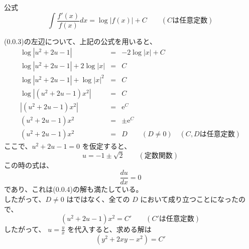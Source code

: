 \documentclass[dvipdfmx,uplatex]{jsarticle}
\begin{document}
\begin{spacing}{1.6}
\begin{qparts}
\begin{itembox}{公式}
       \begin{equation}
         \int \frac{f{\prime}(x)}{f(x)} dx = \log |f(x)| + C \qquad (Cは任意定数) \nonumber
       \end{equation}
    \end{itembox}
    (0.0.3)の左辺について、上記の公式を用いると、
    \begin{eqnarray}
      \log |u ^ 2 + 2u - 1| & = & -2 \log |x| + C \nonumber \\
      \log |u ^ 2 + 2u - 1| + 2 \log |x| & = & C \nonumber \\
      \log |u ^ 2 + 2u - 1| + \log |x| ^ 2 & = & C \nonumber \\
      \log |(u ^ 2 + 2u - 1)x ^ 2| & = & C \nonumber \\
      |(u ^ 2 + 2u - 1)x ^ 2| & = & \mathrm{e} ^ C \nonumber \\
      (u ^ 2 + 2u - 1)x ^ 2 & = & \pm \mathrm{e} ^ C \nonumber \\
      (u ^ 2 + 2u - 1)x ^ 2 & = & D \nonumber \qquad (D \neq 0) \quad (C, D は任意定数)
    \end{eqnarray}
    ここで、$ u ^ 2 + 2u - 1 = 0 $ を仮定すると、\\
    \begin{equation}
      u = -1 \pm \sqrt{2} \qquad (定数関数)
    \end{equation}
    この時の式は、
    \begin{equation}
      \frac{du}{dx} = 0 \nonumber
    \end{equation}
    であり、これは(0.0.4)の解も満たしている。\\
    したがって、$ D \neq 0 $ はではなく、全ての $ D $ において成り立つことになったので、
    \begin{equation}
      (u ^ 2 + 2u - 1)x ^ 2 = C{\prime} \qquad (C{\prime}は任意定数) \nonumber
    \end{equation}
    したがって、 $ \displaystyle u = \frac{y}{x} $ を代入すると、求める解は
    \begin{equation}
      (y ^ 2 + 2xy - x ^ 2) = C{\prime} \nonumber
    \end{equation}
\end{qparts}
\end{spacing}
\end{document}
